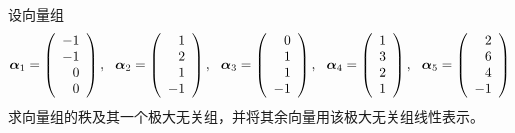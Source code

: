 \begin{frame}
  \begin{li}[$\bigstar$]
    设向量组
    $$
    \boldsymbol{\alpha}_1=\left(
      \begin{array}{r}
        -1\\-1\\0\\0
      \end{array}
    \right),~~ \boldsymbol{\alpha}_2=\left(
      \begin{array}{r}
        1\\2\\1\\-1
      \end{array}
    \right),~~ \boldsymbol{\alpha}_3=\left(
      \begin{array}{r}
        0\\1\\1\\-1
      \end{array}
    \right),~~ \boldsymbol{\alpha}_4=\left(
      \begin{array}{r}
        1\\3\\2\\1
      \end{array}
    \right),~~ \boldsymbol{\alpha}_5=\left(
      \begin{array}{r}
        2\\6\\4\\-1
      \end{array}
    \right)
    $$
    求向量组的秩及其一个极大无关组，并将其余向量用该极大无关组线性表示。
  \end{li}
\end{frame}

